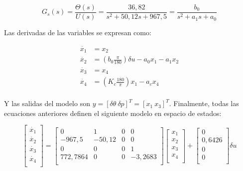 \documentclass[a4paper, twoside, 10pt, spanish]{article}
\numberwithin{table}{section}
\begin{document}
\begin{equation}
    G_s(s) = \frac{\Theta(s)}{U(s)} = \frac{36,82}{s^2 + 50,12s + 967,5} = \frac{b_0}{s^2 + a_1 s + a_0}
\end{equation}

Las derivadas de las variables se expresan como:

\begin{align}
    \dot{x_1} &= x_2\\
    \dot{x_2} &= (b_0 \frac{\pi}{180}) \delta u - a_0 x_1 - a_1 x_2\\
    \dot{x_3} &= x_4\\
    \dot{x_4} &= (K_c \frac{180}{\pi}) x_1 - a_c x_4\\
\end{align}

Y las salidas del modelo son $y = [\delta \theta \ \delta p]^T = [x_1 \ x_3]^T$. Finalmente, todas las ecuaciones anteriores definen el siguiente modelo en espacio de estados:

\begin{equation}
    \begin{bmatrix}
        \dot{x_1}\\
        \dot{x_2}\\
        \dot{x_3}\\
        \dot{x_4}\\
    \end{bmatrix}
    = 
    \begin{bmatrix}
        0 & 1 & 0 & 0\\
        -967,5 & -50,12 & 0 & 0\\
        0 & 0 & 0 & 1\\
        772,7864 & 0 & 0 & -3,2683\\
    \end{bmatrix}
    \begin{bmatrix}
        x_1 \\ x_2 \\ x_3 \\ x_4\\
    \end{bmatrix}
    +
    \begin{bmatrix}
        0 \\ 0,6426 \\ 0 \\ 0\\
    \end{bmatrix} \delta u
\end{equation}
\end{document}
